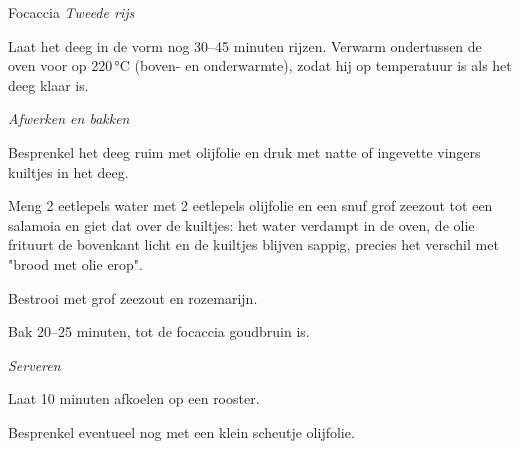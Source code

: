 \begin{recipe}{Focaccia}
\medskip
\noindent\textit{Tweede rijs}
\begin{steps}
  \item Laat het deeg in de vorm nog 30–45 minuten rijzen. Verwarm
        ondertussen de oven voor op 220\,°C (boven- en onderwarmte), zodat
        hij op temperatuur is als het deeg klaar is.
\end{steps}

\medskip
\noindent\textit{Afwerken en bakken}
\begin{steps}
  \item Besprenkel het deeg ruim met olijfolie en druk met natte of
        ingevette vingers kuiltjes in het deeg.
  \item Meng 2 eetlepels water met 2 eetlepels olijfolie en een snuf grof
        zeezout tot een salamoia en giet dat over de kuiltjes: het water
        verdampt in de oven, de olie frituurt de bovenkant licht en de
        kuiltjes blijven sappig, precies het verschil met "brood met olie
        erop".
  \item Bestrooi met grof zeezout en rozemarijn.
  \item Bak 20–25 minuten, tot de focaccia goudbruin is.
\end{steps}

\medskip
\noindent\textit{Serveren}
\begin{steps}
  \item Laat 10 minuten afkoelen op een rooster.
  \item Besprenkel eventueel nog met een klein scheutje olijfolie.
\end{steps}

\end{recipe}
